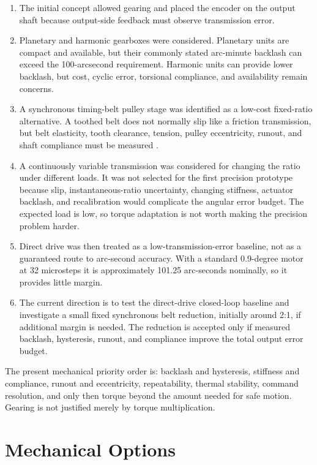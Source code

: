 \documentclass[11pt,a4paper]{article}
\begin{document}
\begin{enumerate}
  \item The initial concept allowed gearing and placed the encoder on the output shaft because output-side feedback must observe transmission error.
  \item Planetary and harmonic gearboxes were considered. Planetary units are compact and available, but their commonly stated arc-minute backlash can exceed the 100-arcsecond requirement. Harmonic units can provide lower backlash, but cost, cyclic error, torsional compliance, and availability remain concerns.
  \item A synchronous timing-belt pulley stage was identified as a low-cost fixed-ratio alternative. A toothed belt does not normally slip like a friction transmission, but belt elasticity, tooth clearance, tension, pulley eccentricity, runout, and shaft compliance must be measured \cite{arduino}.
  \item A continuously variable transmission was considered for changing the ratio under different loads. It was not selected for the first precision prototype because slip, instantaneous-ratio uncertainty, changing stiffness, actuator backlash, and recalibration would complicate the angular error budget. The expected load is low, so torque adaptation is not worth making the precision problem harder.
  \item Direct drive was then treated as a low-transmission-error baseline, not as a guaranteed route to arc-second accuracy. With a standard 0.9-degree motor at 32 microsteps it is approximately 101.25 arc-seconds nominally, so it provides little margin.
  \item The current direction is to test the direct-drive closed-loop baseline and investigate a small fixed synchronous belt reduction, initially around 2:1, if additional margin is needed. The reduction is accepted only if measured backlash, hysteresis, runout, and compliance improve the total output error budget.
\end{enumerate}

The present mechanical priority order is: backlash and hysteresis, stiffness and compliance, runout and eccentricity, repeatability, thermal stability, command resolution, and only then torque beyond the amount needed for safe motion. Gearing is not justified merely by torque multiplication.

\section{Mechanical Options}
\end{document}
